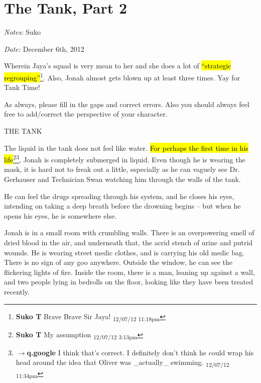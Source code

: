 \setcounter{chapter}{ 11 }
\chapter{\textbf{The Tank, Part 2} }






\textit{Notes:} Suko

\textit{Date:} December 6th, 2012



Wherein Jaya's squad is very mean to her and she does a lot of \hl{``strategic regrouping''}\footnote{\textbf{Suko T }Brave Brave Sir Jaya! \textsubscript{12/07/12 11:18pm}}.  Also, Jonah almost gets blown up at least three times.  Yay for Tank Time!



As always, please fill in the gaps and correct errors.  Also you should always feel free to add/correct the perspective of your character.



\noindent\hrulefill





 {\LARGE THE TANK } 



The liquid in the tank does not feel like water. \hl{For perhaps the first time in his life}\footnote{\textbf{Suko T }My assumption \textsubscript{12/07/12 3:13pm}}\footnote{$\rightarrow$\textbf{q.google }I think that's correct.  I definitely don't think he could wrap his head around the idea that Oliver was \_actually\_ swimming. \textsubscript{12/07/12 11:34pm}}, Jonah is completely submerged in liquid.  Even though he is wearing the mask, it is hard not to freak out a little, especially as he can vaguely see Dr. Gerhauser and Technician Swan watching him through the walls of the tank.  



He can feel the drugs spreading through his system, and he closes his eyes, intending on taking a deep breath before the drowning begins -- but when he opens his eyes, he is somewhere else.  



Jonah is in a small room with crumbling walls.  There is an overpowering smell of dried blood in the air, and underneath that, the acrid stench of urine and putrid wounds.  He is wearing street medic clothes, and is carrying his old medic bag.  There is no sign of any goo anywhere.  Outside the window, he can see the flickering lights of fire.  Inside the room, there is a man, leaning up against a wall, and two people lying in bedrolls on the floor, looking like they have been treated recently.



